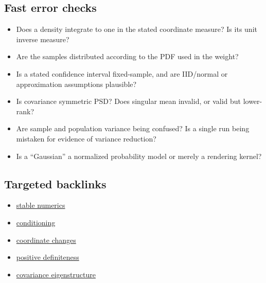 \subsection{Fast error checks}\label{appendix-cb5af353ef77-fast-error-checks}

\begin{itemize}
\tightlist
\item
  Does a density integrate to one in the stated coordinate measure? Is its unit inverse measure?
\item
  Are the samples distributed according to the PDF used in the weight?
\item
  Is a stated confidence interval fixed-sample, and are IID/normal or approximation assumptions plausible?
\item
  Is covariance symmetric PSD? Does singular mean invalid, or valid but lower-rank?
\item
  Are sample and population variance being confused? Is a single run being mistaken for evidence of variance reduction?
\item
  Is a ``Gaussian'' a normalized probability model or merely a rendering kernel?
\end{itemize}

\subsection{Targeted backlinks}\label{appendix-cb5af353ef77-targeted-backlinks}

\begin{itemize}
\tightlist
\item
  \href{Continuous\%20Notes/Computing\%20Foundations\%20-\%20From\%20Bits\%20to\%20C++\%20and\%20Systems\%20APIs\#A\%20direction\%20can\%20exist\%20even\%20when\%20the\%20naive\%20length\%20overflows}{stable numerics}
\item
  \hyperref[01-foundations-i-ch018-an-inverse-can-exist-and-still-amplify-uncertainty]{conditioning}
\item
  \hyperref[01-foundations-i-ch019-coordinates-can-change-while-the-geometric-object-stays-still]{coordinate changes}
\item
  \hyperref[01-foundations-i-ch020-positive-definiteness-is-a-structural-promise]{positive definiteness}
\item
  \hyperref[01-foundations-i-ch020-diagonalization-leads-to-the-stronger-symmetric-spectral-theorem]{covariance eigenstructure}
\end{itemize}

